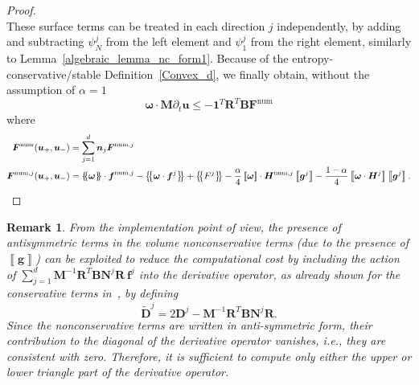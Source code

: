 \documentclass[]{scrartcl}
\newcommand*{\ldblbrace}{\{\mskip-5mu \left \{}
\newcommand*{\rdblbrace}{ \}\mskip-5mu \right \}}
\newcommand{\mean}[1]{\left\ldblbrace #1 \right\rdblbrace}
\newcommand{\mtx}[1]{\boldsymbol{#1}}
\renewcommand{\vec}[1]{\boldsymbol{#1}}
\newcommand{\vecs}[1]{\underline{#1}}
\newcommand{\jump}[1]{\left\llbracket #1  \right\rrbracket}
\newtheorem{remark}[theorem]{Remark}
\theoremstyle{definition}
\begin{document}
\begin{proof}
\begin{equation}
\end{equation}
These surface terms can be treated in each direction $j$ independently, by adding and subtracting $\psi^j_N$ from the left element and $\psi^j_1$ from the right element, similarly to Lemma~\ref{algebraic_lemma_nc_form1}. Because of the entropy-conservative/stable Definition~\ref{Convex_d}, we finally obtain, without the assumption of $\alpha =1$
\begin{equation}
\vec{\omega} \cdot \mtx{M} \partial_t \vec{u} \leq -\mtx{1}^T \mtx{R}^T \mtx{B} \vec{F}^{\mathrm{num}}
\end{equation}
where
\begin{equation}
    \begin{aligned}
\vec{F}^{\mathrm{num}}(\vec{u}_+, \vec{u}_-) &= \sum_{j=1}^d \vec{n}_j \vec{F}^{\mathrm{num},j}\\
\vec{F}^{\mathrm{num},j}(\vec{u}_+, \vec{u}_-) &= \mean{\vec{\omega}} \cdot \vec{f}^{\mathrm{num},j}  -\mean{\vec{\omega} \cdot \vec{f}^j} +  \mean{F^j} - \frac{\alpha}{4}\jump{\vec{\omega}} \cdot \vec{H}^{\mathrm{num},j}\jump{\vec{g}^j} - \frac{1-\alpha}{4}\jump{\vec{\omega} \cdot \vec{H}^j} \jump{\vec{g}^j}.
    \end{aligned}
\end{equation}
\end{proof}

\begin{remark}
    From the implementation point of view, the presence of antisymmetric terms in the volume nonconservative terms (due to the presence of $\jump{\vec{g}}$) can be exploited to reduce the computational cost by including the action of $\sum_{j = 1}^d \mtx{M}^{-1} \mtx{R}^T \mtx{B} \mtx{N}^j \mtx{R}\ \vec{f}^j$ into the derivative operator, as already shown for the conservative terms in~\cite{ranocha2023efficient}, by defining
    \begin{equation}
    \tilde{\mtx{D}}^j = 2 \mtx{D}^j - \mtx{M}^{-1} \mtx{R}^T \mtx{B} \mtx{N}^j \mtx{R}.
    \end{equation}
    Since the nonconservative terms are written in anti-symmetric form, their contribution to the diagonal of the derivative operator vanishes, i.e., they are consistent with zero. Therefore, it is sufficient to compute only either the upper or lower triangle part of the derivative operator.
\end{remark}
\end{document}
